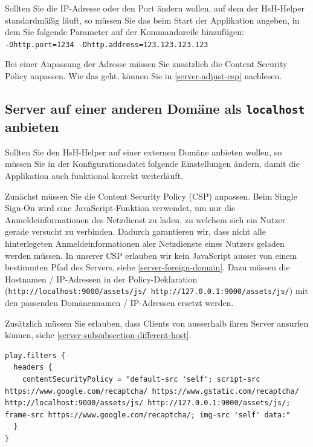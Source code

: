 \documentclass[12pt,DIV14,BCOR10mm,a4paper,parskip=half-,headsepline,headinclude,english,ngerman,bibliography=totocnumbered]{scrreprt}
\begin{document}
Sollten Sie die IP-Adresse oder den Port ändern wollen, auf dem der HsH-Helper standardmäßig läuft, so müssen Sie das beim Start der Applikation angeben, in dem Sie folgende Parameter auf der Kommandozeile hinzufügen: \\
\texttt{-Dhttp.port=1234 -Dhttp.address=123.123.123.123}

Bei einer Anpassung der Adresse müssen Sie zusätzlich die Content Security Policy anpassen.
Wie das geht, können Sie in \autoref{server-adjust-csp} nachlesen.

\subsection{Server auf einer anderen Domäne als \texttt{localhost} anbieten}

Sollten Sie den HsH-Helper auf einer externen Domäne anbieten wollen, so müssen Sie in der Konfigurationsdatei folgende Einstellungen ändern, damit die Applikation auch funktional korrekt weiterläuft.

Zunächst müssen Sie die Content Security Policy (CSP) anpassen.\label{server-adjust-csp}
Beim Single Sign-On wird eine JavaScript-Funktion verwendet, um nur die Anmeldeinformationen des Netzdienst zu laden, zu welchem sich ein Nutzer gerade versucht zu verbinden.
Dadurch garantieren wir, dass nicht alle hinterlegeten Anmeldeinformationen aler Netzdienste eines Nutzers geladen werden müssen.
In unserer CSP erlauben wir kein JavaScript ausser von einem bestimmten Pfad des Servers, siehe \autoref{server-foreign-domain}.
Dazu müssen die Hostnamen / IP-Adressen in der Policy-Deklaration (\texttt{http://localhost:9000/assets/js/ http://127.0.0.1:9000/assets/js/}) mit den passenden Domänennamen / IP-Adressen ersetzt werden.

Zusätzlich müssen Sie erlauben, dass Clients von ausserhalb ihren Server ansurfen können, siehe \autoref{server-subsubsection-different-host}.

\begin{lstlisting}[label=server-foreign-domain, caption={"Content Security Header"-Einstellung innerhalb der Konfigurationsdatei}, captionpos=b]
play.filters {
  headers {
    contentSecurityPolicy = "default-src 'self'; script-src https://www.google.com/recaptcha/ https://www.gstatic.com/recaptcha/ http://localhost:9000/assets/js/ http://127.0.0.1:9000/assets/js/; frame-src https://www.google.com/recaptcha/; img-src 'self' data:"
  }
}
\end{lstlisting}
\end{document}

